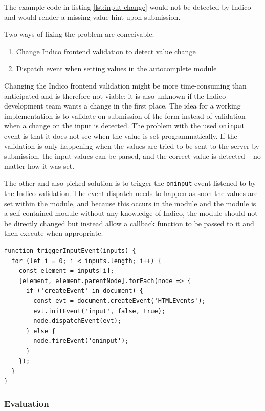 The example code in listing \ref{lst:input-change} would not be detected by Indico and would render a missing value hint upon submission.

Two ways of fixing the problem are conceivable.

\begin{enumerate}
    \item Change Indico frontend validation to detect value change
    \item Dispatch event when setting values in the autocomplete module
\end{enumerate}

Changing the Indico frontend validation might be more time-consuming than anticipated and is therefore not viable; it is also unknown if the Indico development team wants a change in the first place. The idea for a working implementation is to validate on submission of the form instead of validation when a change on the input is detected. The problem with the used \texttt{oninput} event is that it does not see when the value is set programmatically. If the validation is only happening when the values are tried to be sent to the server by submission, the input values can be parsed, and the correct value is detected -- no matter how it was set. 

The other and also picked solution is to trigger the \texttt{oninput} event listened to by the Indico validation. The event dispatch needs to happen as soon the values are set within the module, and because this occurs in the module and the module is a self-contained module without any knowledge of Indico, the module should not be directly changed but instead allow a callback function to be passed to it and then execute when appropriate.

\begin{lstlisting}[language=Other,columns=fullflexible, caption={Dispatching the \texttt{oninput} event within a callback.}, label={lst:oninput-callback}]
function triggerInputEvent(inputs) {
  for (let i = 0; i < inputs.length; i++) {
    const element = inputs[i];
    [element, element.parentNode].forEach(node => {
      if ('createEvent' in document) {
        const evt = document.createEvent('HTMLEvents');
        evt.initEvent('input', false, true);
        node.dispatchEvent(evt);
      } else {
        node.fireEvent('oninput');
      }
    });
  }
}
\end{lstlisting}

\subsubsection{Evaluation}\mbox{}\\

